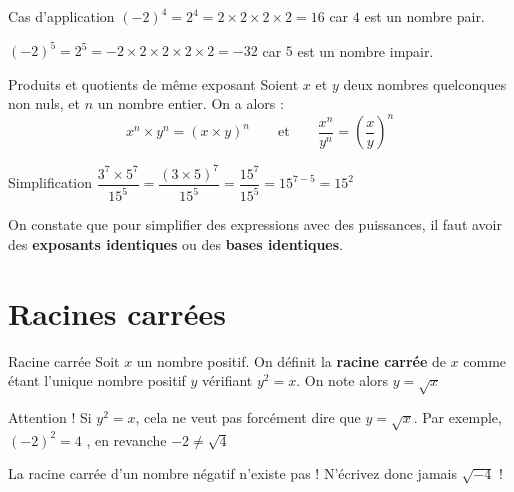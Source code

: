 \documentclass[oneside,12pt]{article}          %
\begin{document}
\begin{exemple}{Cas d'application}
	$(-2)^4 = 2^4 = 2 \times 2 \times 2 \times 2 = 16$ \quad car $4$ est un nombre pair.
	
	$(-2)^5 = 2^5 = -2 \times 2 \times 2 \times 2 \times 2 = -32$ \quad car $5$ est un nombre impair.
\end{exemple}



\begin{propriete}{Produits et quotients de même exposant}
	Soient $x$ et $y$ deux nombres quelconques non nuls, et $n$  un nombre entier. On a alors :
	\[ x^n \times y^n = (x \times y)^n \qquad \text{et} \qquad \dfrac{x^n}{y^n} = \left( \dfrac{x}{y} \right)^n \]
\end{propriete}

\begin{minipage}{0.45\textwidth}
	\begin{exemple}{Simplification}
		$\dfrac{3^7 \times 5^7}{15^5} = \dfrac{(3\times5)^7}{15^5} = \dfrac{15^7}{15^5} = 15^{7-5} = 15^2$
	\end{exemple}
\end{minipage}
\begin{minipage}{0.55\textwidth}
	\begin{remarque}
		On constate que pour simplifier des expressions avec des puissances, il faut avoir des \textbf{exposants identiques} ou des \textbf{bases identiques}.
		\end{remarque}
\end{minipage}



\section{Racines carrées}

\begin{definition}{Racine carrée}
	Soit $x$ un nombre positif. On définit la \textbf{racine carrée} de $x$ comme étant l'unique nombre positif $y$ vérifiant $y^2=x$. On note alors $y=\sqrt{x}$
\end{definition}

\begin{remarque}
	Attention ! Si $y^2=x$, cela ne veut pas forcément dire que $y=\sqrt{x}$. Par exemple, $(-2)^2=4$ , en revanche $-2 \neq \sqrt{4}$
\end{remarque}

\begin{remarque}
	La racine carrée d'un nombre négatif n'existe pas ! N'écrivez donc jamais $\sqrt{-4}$ !
\end{remarque}
\end{document}
